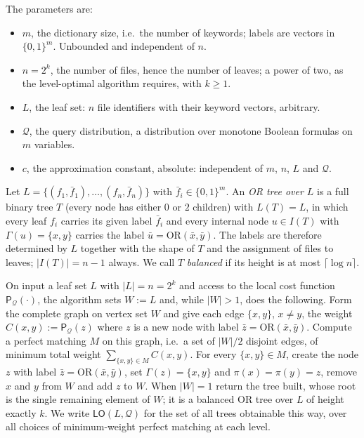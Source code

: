 \documentclass{aicr-conjecture}
\newcommand{\bits}{\{0,1\}}
\newcommand{\Qd}{\mathcal{Q}}
\newcommand{\ORv}{\mathrm{OR}}
\newcommand{\Pcost}{\mathsf{P}}
\newcommand{\LO}{\mathsf{LO}}
\begin{document}
The parameters are:
\begin{itemize}
\item $m$, the dictionary size, i.e.\ the number of keywords; labels are
  vectors in $\bits^m$. Unbounded and independent of $n$.
\item $n = 2^{k}$, the number of files, hence the number of leaves; a power
  of two, as the level-optimal algorithm requires, with $k \ge 1$.
\item $L$, the leaf set: $n$ file identifiers with their keyword vectors,
  arbitrary.
\item $\Qd$, the query distribution, a distribution over monotone Boolean
  formulas on $m$ variables.
\item $c$, the approximation constant, absolute: independent of $m$, $n$,
  $L$ and $\Qd$.
\end{itemize}

\begin{definition}\label{def:ortree}
Let $L = \{(f_1,\bar f_1),\dots,(f_n,\bar f_n)\}$ with
$\bar f_i \in \bits^{m}$. An \emph{OR tree over $L$} is a full binary tree
$T$ (every node has either $0$ or $2$ children) with $L(T) = L$, in which
every leaf $f_i$ carries its given label $\bar f_i$ and every internal node
$u \in I(T)$ with $\Gamma(u) = \{x,y\}$ carries the label
$\bar u = \ORv(\bar x, \bar y)$. The labels are therefore determined by $L$
together with the shape of $T$ and the assignment of files to leaves;
$|I(T)| = n - 1$ always. We call $T$ \emph{balanced} if its height is at
most $\lceil \log n \rceil$.
\end{definition}

\begin{definition}[the level-optimal algorithm $\LO$]\label{def:lo}
On input a leaf set $L$ with $|L| = n = 2^k$ and access to the local cost
function $\Pcost_{\Qd}(\cdot)$, the algorithm sets $W := L$ and, while
$|W| > 1$, does the following. Form the complete graph on vertex set $W$
and give each edge $\{x,y\}$, $x \neq y$, the weight
$C(x,y) := \Pcost_{\Qd}(z)$ where $z$ is a new node with label
$\bar z = \ORv(\bar x, \bar y)$. Compute a perfect matching $M$ on this
graph, i.e.\ a set of $|W|/2$ disjoint edges, of minimum total weight
$\sum_{\{x,y\} \in M} C(x,y)$. For every $\{x,y\} \in M$, create the node
$z$ with label $\bar z = \ORv(\bar x, \bar y)$, set $\Gamma(z) = \{x,y\}$
and $\pi(x) = \pi(y) = z$, remove $x$ and $y$ from $W$ and add $z$ to $W$.
When $|W| = 1$ return the tree built, whose root is the single remaining
element of $W$; it is a balanced OR tree over $L$ of height exactly $k$. We
write $\LO(L,\Qd)$ for the set of all trees obtainable this way, over all
choices of minimum-weight perfect matching at each level.
\end{definition}
\end{document}
